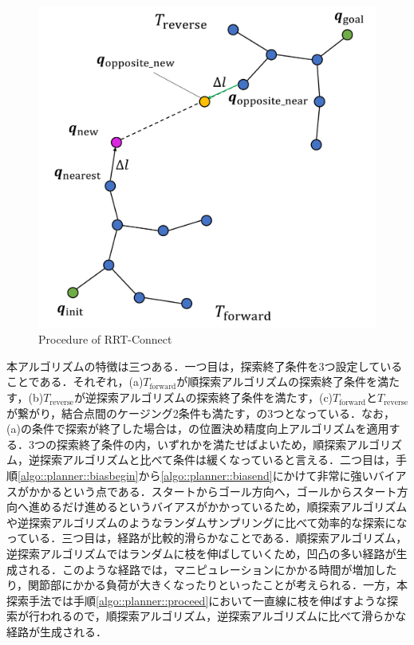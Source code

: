 \documentclass[a4paper,twoside,12pt,papersize, dvipdfmx]{iirthesis}
\begin{document}
\begin{figure}[b]
\centering
\includegraphics[width=0.6\hsize]{fig/3-new-planner/RRTConnect.pdf}
\caption{Procedure of RRT-Connect}
\label{fig::planner::rrtconnect}
\end{figure}

本アルゴリズムの特徴は三つある．一つ目は，探索終了条件を3つ設定していることである．それぞれ，(a)$T_{\mathrm {forward}}$が順探索アルゴリズムの探索終了条件を満たす，(b)$T_{\mathrm {reverse}}$が逆探索アルゴリズムの探索終了条件を満たす，(c)$T_{\mathrm {forward}}$と$T_{\mathrm {reverse}}$が繋がり，結合点間のケージング2条件も満たす，の3つとなっている．なお，(a)の条件で探索が終了した場合は，の位置決め精度向上アルゴリズムを適用する．3つの探索終了条件の内，いずれかを満たせばよいため，順探索アルゴリズム，逆探索アルゴリズムと比べて条件は緩くなっていると言える．二つ目は，手順\ref{algo::planner::biasbegin}から\ref{algo::planner::biasend}にかけて非常に強いバイアスがかかるという点である．スタートからゴール方向へ，ゴールからスタート方向へ進めるだけ進めるというバイアスがかかっているため，順探索アルゴリズムや逆探索アルゴリズムのようなランダムサンプリングに比べて効率的な探索になっている．三つ目は，経路が比較的滑らかなことである．順探索アルゴリズム，逆探索アルゴリズムではランダムに枝を伸ばしていくため，凹凸の多い経路が生成される．このような経路では，マニピュレーションにかかる時間が増加したり，関節部にかかる負荷が大きくなったりといったことが考えられる．一方，本探索手法では手順\ref{algo::planner::proceed}において一直線に枝を伸ばすような探索が行われるので，順探索アルゴリズム，逆探索アルゴリズムに比べて滑らかな経路が生成される．
\end{document}
